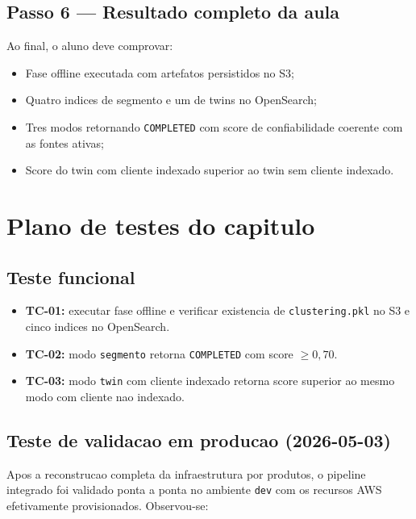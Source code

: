 \subsection{Passo 6 --- Resultado completo da aula}

Ao final, o aluno deve comprovar:

\begin{itemize}[leftmargin=*]
  \item Fase offline executada com artefatos persistidos no S3;
  \item Quatro indices de segmento e um de twins no OpenSearch;
  \item Tres modos retornando \texttt{COMPLETED} com score de
        confiabilidade coerente com as fontes ativas;
  \item Score do twin com cliente indexado superior ao twin sem
        cliente indexado.
\end{itemize}

\section{Plano de testes do capitulo}

\subsection{Teste funcional}

\begin{itemize}[leftmargin=*]
  \item \textbf{TC-01:} executar fase offline e verificar existencia
        de \texttt{clustering.pkl} no S3 e cinco indices no OpenSearch.
  \item \textbf{TC-02:} modo \texttt{segmento} retorna
        \texttt{COMPLETED} com score $\geq 0{,}70$.
  \item \textbf{TC-03:} modo \texttt{twin} com cliente indexado retorna
        score superior ao mesmo modo com cliente nao indexado.
\end{itemize}

\subsection{Teste de validacao em producao (2026-05-03)}

Apos a reconstrucao completa da infraestrutura por produtos, o pipeline
integrado foi validado ponta a ponta no ambiente \texttt{dev} com os
recursos AWS efetivamente provisionados. Observou-se:

